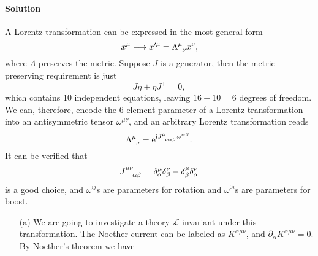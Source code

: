 \documentclass[hyperref, a4paper]{article}
\newcommand*{\ii}{\mathrm{i}}
\newcommand*{\ee}{\mathrm{e}}
\begin{document}
\paragraph{Solution} A Lorentz transformation can be expressed in the most general form
\begin{equation}
    x^\mu \longrightarrow x'^\mu = \Lambda\indices{^\mu_\nu} x^\nu,
\end{equation}
where $\Lambda$ preserves the metric. Suppose $J$ is a generator, then the metric-preserving requirement is just 
\begin{equation}
    J \eta + \eta J^\top = 0,
\end{equation}
which contains 10 independent equations, leaving $16-10=6$ degrees of freedom.
We can, therefore, encode the 6-element parameter of a Lorentz transformation into an antisymmetric tensor $\omega^{\mu \nu}$, and an arbitrary Lorentz transformation reads
\begin{equation}
    \Lambda\indices{^\mu_\nu} = \ee^{\ii J\indices{^\mu_\nu_\alpha_\beta} \omega^{\alpha \beta}}.
\end{equation}
It can be verified that 
\begin{equation}
    J\indices{^\mu^\nu_\alpha_\beta} = \delta^\mu_\alpha \delta^\nu_\beta - \delta^\mu_\beta \delta^\nu_\alpha
\end{equation}
is a good choice, and $\omega^{ij}$s are parameters for rotation and $\omega^{0i}$s are parameters for boost. 

\begin{itemize}
    \item[(a)] We are going to investigate a theory $\mathcal{L}$ invariant under this transformation.
    The Noether current can be labeled as $K^{\alpha \mu \nu}$, and $\partial_\alpha K^{\alpha \mu \nu} = 0$. By Noether's theorem we have 
    
\end{itemize}
\end{document}
